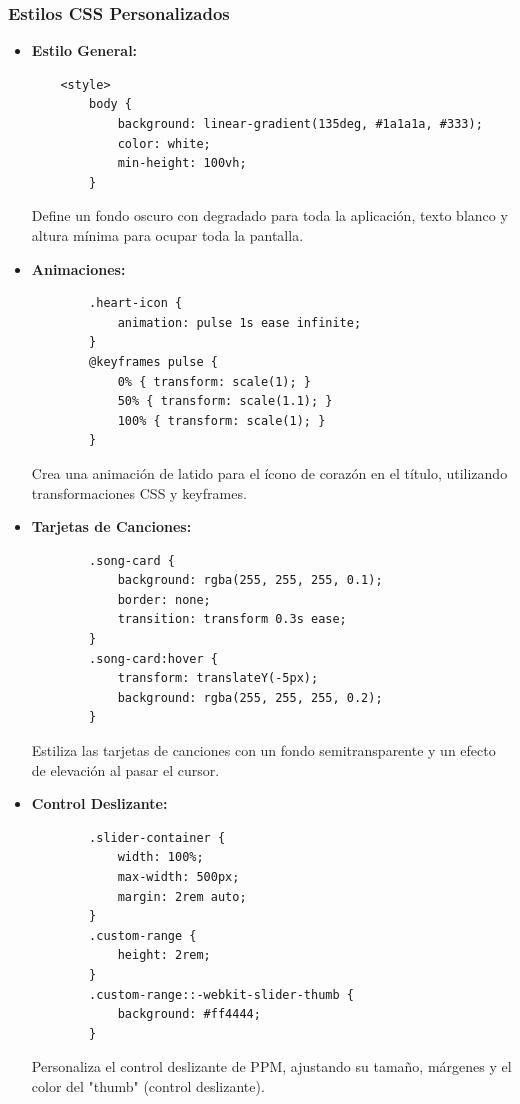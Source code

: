 \documentclass[a4paper,12pt]{article}
\begin{document}
\subsubsection{Estilos CSS Personalizados}
\begin{itemize}
    \item \textbf{Estilo General:}
    \begin{verbatim}
    <style>
        body {
            background: linear-gradient(135deg, #1a1a1a, #333);
            color: white;
            min-height: 100vh;
        }
    \end{verbatim}
    Define un fondo oscuro con degradado para toda la aplicación, texto blanco y altura mínima para ocupar toda la pantalla.

    \item \textbf{Animaciones:}
    \begin{verbatim}
        .heart-icon {
            animation: pulse 1s ease infinite;
        }
        @keyframes pulse {
            0% { transform: scale(1); }
            50% { transform: scale(1.1); }
            100% { transform: scale(1); }
        }
    \end{verbatim}
    Crea una animación de latido para el ícono de corazón en el título, utilizando transformaciones CSS y keyframes.

    \item \textbf{Tarjetas de Canciones:}
    \begin{verbatim}
        .song-card {
            background: rgba(255, 255, 255, 0.1);
            border: none;
            transition: transform 0.3s ease;
        }
        .song-card:hover {
            transform: translateY(-5px);
            background: rgba(255, 255, 255, 0.2);
        }
    \end{verbatim}
    Estiliza las tarjetas de canciones con un fondo semitransparente y un efecto de elevación al pasar el cursor.

    \item \textbf{Control Deslizante:}
    \begin{verbatim}
        .slider-container {
            width: 100%;
            max-width: 500px;
            margin: 2rem auto;
        }
        .custom-range {
            height: 2rem;
        }
        .custom-range::-webkit-slider-thumb {
            background: #ff4444;
        }
    \end{verbatim}
    Personaliza el control deslizante de PPM, ajustando su tamaño, márgenes y el color del "thumb" (control deslizante).
\end{itemize}
\end{document}
